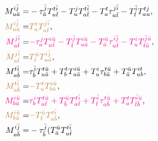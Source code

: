 \documentclass[a4paper,12pt,oneside]{book}
\newcommand{\magenta}[1]{{\color{magenta} #1}}
\newcommand{\brown}[1]{{\color{brown} #1}}
\newcommand{\spa}[1]{{#1}}
\newcommand{\spb}[1]{\bar{#1}}
\begin{document}
\begin{align}
M^{\spa{i}\spb{j}}_{\spa{u}\spb{a}} = &-\tau^{\spb{j}}_{\spb{a}} T^{\spa{t}\spb{i}}_{\spa{u}\spb{t}} 
                                       -T^{\spa{j}}_{\spa{u}} T^{\spa{t}\spb{i}}_{\spa{a}\spb{t}}
                                       -T^{\spa{t}}_{\spa{a}} \tau^{\spa{j}\spb{i}}_{\spa{u}\spb{t}} 
                                       -T^{\spb{i}}_{\spb{t}} T^{\spa{t}\spa{j}}_{\spa{a}\spa{u}},\\
\brown{M^{\spa{i}\spb{j}}_{\spa{u}\spb{a}}} = &\brown{T^{\spa{t}}_{\spa{u}} T^{\spa{j}\spb{i}}_{\spa{a}\spb{t}}},\\
\magenta{M^{\spa{j}\spb{i}}_{\spa{a}\spb{t}}} = &\magenta{-\tau^{\spa{j}}_{\spa{a}} T^{\spa{i}\spb{u}}_{\spa{u}\spb{t}} 
                                                -T^{\spb{j}}_{\spb{t}} T^{\spa{i}\spb{u}}_{\spa{u}\spb{a}}
                                                -T^{\spb{u}}_{\spb{a}} \tau^{\spa{i}\spb{j}}_{\spa{u}\spb{t}}
                                                -T^{\spa{i}}_{\spa{u}} T^{\spb{j}\spb{u}}_{\spb{t}\spb{a}}}, \\
\brown{M^{\spa{j}\spb{i}}_{\spa{a}\spb{t}}} = &\brown{T^{\spb{u}}_{\spb{t}} T^{\spa{i}\spb{j}}_{\spa{u}\spb{a}}},\\
M^{\spa{t}\spb{i}}_{\spa{a}\spb{b}} = &\tau^{\spb{i}}_{\spb{b}} T^{\spa{t}\spb{u}}_{\spa{u}\spb{a}} 
                                      +T^{\spa{t}}_{\spa{b}} T^{\spa{i}\spb{u}}_{\spa{u}\spb{a}}
                                      +T^{\spa{i}}_{\spa{u}} \tau^{\spa{t}\spb{u}}_{\spa{b}\spb{a}}
                                      +T^{\spb{u}}_{\spb{a}} T^{\spa{i}\spa{t}}_{\spa{u}\spa{b}},\\
\brown{M^{\spa{t}\spb{i}}_{\spa{a}\spb{b}}} = &\brown{- T^{\spa{t}}_{\spa{u}} T^{\spa{i}\spb{u}}_{\spa{b}\spb{a}}} ,\\
\magenta{M^{\spa{i}\spb{u}}_{\spa{b}\spb{a}}} = &\magenta{\tau^{\spa{i}}_{\spa{b}} T^{\spa{t}\spb{u}}_{\spa{a}\spb{t}}
                                                +T^{\spb{u}}_{\spb{b}} T^{\spa{t}\spb{i}}_{\spa{a}\spb{t}}
                                                +T^{\spb{i}}_{\spb{t}} \tau^{\spa{t}\spb{u}}_{\spa{a}\spb{b}}
                                                +T^{\spa{t}}_{\spa{a}} T^{\spb{i}\spb{u}}_{\spb{t}\spb{b}}},\\
\brown{M^{\spa{i}\spb{u}}_{\spa{b}\spb{a}}} = &\brown{-T^{\spb{u}}_{\spb{t}} T^{\spa{t}\spb{i}}_{\spa{a}\spb{b}}}, \\
M^{\spa{i}\spb{j}}_{\spa{a}\spb{b}} = &-\tau^{\spb{j}}_{\spb{b}} (T^{\spb{u}}_{\spb{a}} T^{\spa{t}\spb{i}}_{\spa{u}\spb{t}}

\end{align}
\end{document}
